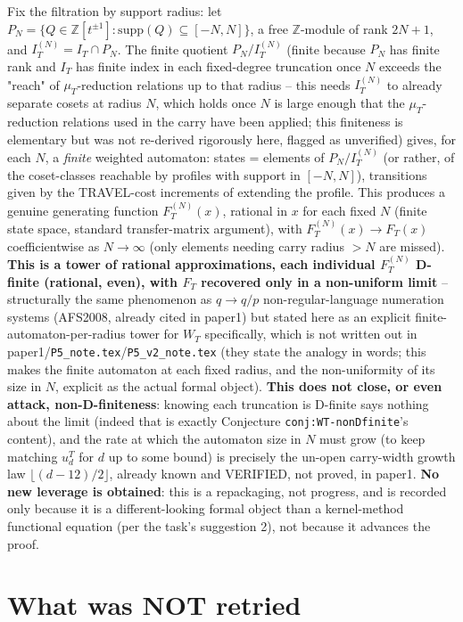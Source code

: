 \documentclass[11pt]{article}
\newcommand{\Z}{\mathbb Z}
\begin{document}
Fix the filtration by support radius: let $P_N=\{Q\in\Z[t^{\pm1}]:\mathrm{supp}(Q)\subseteq[-N,N]\}$,
a free $\Z$-module of rank $2N+1$, and $I_T^{(N)}=I_T\cap P_N$. The finite quotient
$P_N/I_T^{(N)}$ (finite because $P_N$ has finite rank and $I_T$ has finite index in each fixed-degree
truncation once $N$ exceeds the "reach" of $\mu_T$-reduction relations up to that radius -- this
needs $I_T^{(N)}$ to already separate cosets at radius $N$, which holds once $N$ is large enough
that the $\mu_T$-reduction relations used in the carry have been applied; this finiteness is
elementary but was not re-derived rigorously here, flagged as unverified) gives, for each $N$, a
\emph{finite} weighted automaton: states = elements of $P_N/I_T^{(N)}$ (or rather, of the
coset-classes reachable by profiles with support in $[-N,N]$), transitions given by the TRAVEL-cost
increments of extending the profile. This produces a genuine generating function $F_T^{(N)}(x)$,
rational in $x$ for each fixed $N$ (finite state space, standard transfer-matrix argument), with
$F_T^{(N)}(x)\to F_T(x)$ coefficientwise as $N\to\infty$ (only elements needing carry radius $>N$ are
missed). \textbf{This is a tower of rational approximations, each individual $F_T^{(N)}$ D-finite
(rational, even), with $F_T$ recovered only in a non-uniform limit} -- structurally the same
phenomenon as $q\to q/p$ non-regular-language numeration systems (AFS2008, already cited in
paper1) but stated here as an explicit finite-automaton-per-radius tower for $W_T$ specifically,
which is not written out in paper1/\texttt{P5\_note.tex}/\texttt{P5\_v2\_note.tex} (they state the
analogy in words; this makes the finite automaton at each fixed radius, and the non-uniformity of
its size in $N$, explicit as the actual formal object). \textbf{This does not close, or even
attack, non-D-finiteness}: knowing each truncation is D-finite says nothing about the limit (indeed
that is exactly Conjecture \texttt{conj:WT-nonDfinite}'s content), and the rate at which the
automaton size in $N$ must grow (to keep matching $u_d^T$ for $d$ up to some bound) is precisely
the un-open carry-width growth law $\lfloor(d-12)/2\rfloor$, already known and VERIFIED, not proved,
in paper1. \textbf{No new leverage is obtained}: this is a repackaging, not progress, and is
recorded only because it is a different-looking formal object than a kernel-method functional
equation (per the task's suggestion 2), not because it advances the proof.

\section{What was NOT retried}
\end{document}
